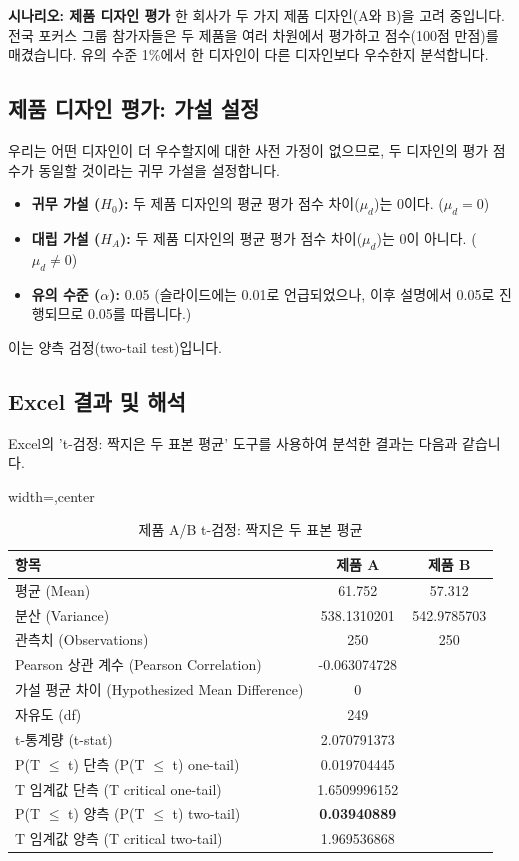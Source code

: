 \documentclass[11pt,a4paper]{article}
\begin{document}
\begin{examplebox}
\textbf{시나리오: 제품 디자인 평가}
한 회사가 두 가지 제품 디자인(A와 B)을 고려 중입니다. 전국 포커스 그룹 참가자들은 두 제품을 여러 차원에서 평가하고 점수(100점 만점)를 매겼습니다. 유의 수준 1\%에서 한 디자인이 다른 디자인보다 우수한지 분석합니다.
\end{examplebox}

\subsection*{제품 디자인 평가: 가설 설정}
우리는 어떤 디자인이 더 우수할지에 대한 사전 가정이 없으므로, 두 디자인의 평가 점수가 동일할 것이라는 귀무 가설을 설정합니다.
\begin{itemize}
    \item \textbf{귀무 가설 ($H_0$):} 두 제품 디자인의 평균 평가 점수 차이($\mu_d$)는 0이다. ($\mu_d = 0$)
    \item \textbf{대립 가설 ($H_A$):} 두 제품 디자인의 평균 평가 점수 차이($\mu_d$)는 0이 아니다. ($\mu_d \ne 0$)
    \item \textbf{유의 수준 ($\alpha$):} 0.05 (슬라이드에는 0.01로 언급되었으나, 이후 설명에서 0.05로 진행되므로 0.05를 따릅니다.)
\end{itemize}
이는 양측 검정(two-tail test)입니다.

\subsection*{Excel 결과 및 해석}
Excel의 't-검정: 짝지은 두 표본 평균' 도구를 사용하여 분석한 결과는 다음과 같습니다.

\begin{table}[h!]
\caption{제품 A/B t-검정: 짝지은 두 표본 평균}
\label{tab:product_ttest_paired}
\centering
\begin{adjustbox}{width=\textwidth,center}
\begin{tabular}{lcc}
\toprule
\textbf{항목} & \textbf{제품 A} & \textbf{제품 B} \\
\midrule
평균 (Mean) & 61.752 & 57.312 \\
분산 (Variance) & 538.1310201 & 542.9785703 \\
관측치 (Observations) & 250 & 250 \\
Pearson 상관 계수 (Pearson Correlation) & -0.063074728 & \\
가설 평균 차이 (Hypothesized Mean Difference) & 0 & \\
자유도 (df) & 249 & \\
t-통계량 (t-stat) & 2.070791373 & \\
P(T $\le$ t) 단측 (P(T $\le$ t) one-tail) & 0.019704445 & \\
T 임계값 단측 (T critical one-tail) & 1.6509996152 & \\
P(T $\le$ t) 양측 (P(T $\le$ t) two-tail) & \textbf{0.03940889} & \\
T 임계값 양측 (T critical two-tail) & 1.969536868 & \\
\bottomrule
\end{tabular}
\end{adjustbox}
\end{table}
\end{document}
